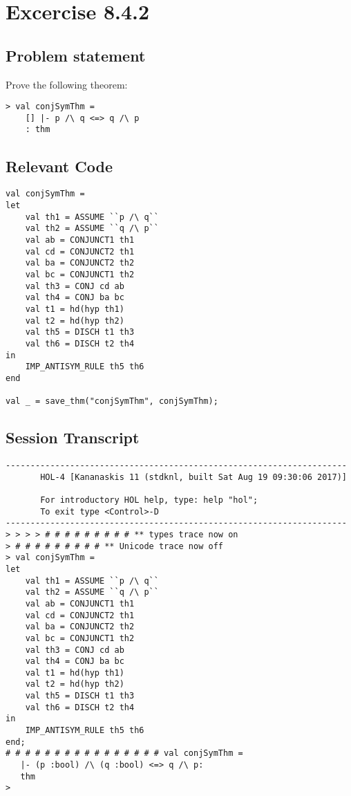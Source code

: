 \documentclass{report}
\begin{document}
\chapter{Excercise 8.4.2}
\label{cha:8.4.2}

\section{Problem statement}
\label{problem-statement-8-4-2}
Prove the following theorem:
\begin{lstlisting}[frame=tblr]
> val conjSymThm =
	[] |- p /\ q <=> q /\ p
	: thm
\end{lstlisting}

\section{Relevant Code}
\label{rel-code-8-4-2}
\begin{lstlisting}[frame=TBlr]
val conjSymThm =
let
	val th1 = ASSUME ``p /\ q``
	val th2 = ASSUME ``q /\ p``
	val ab = CONJUNCT1 th1
	val cd = CONJUNCT2 th1
	val ba = CONJUNCT2 th2
	val bc = CONJUNCT1 th2
	val th3 = CONJ cd ab
	val th4 = CONJ ba bc
	val t1 = hd(hyp th1)
	val t2 = hd(hyp th2)
	val th5 = DISCH t1 th3
	val th6 = DISCH t2 th4
in
	IMP_ANTISYM_RULE th5 th6
end

val _ = save_thm("conjSymThm", conjSymThm);
\end{lstlisting}

\section{Session Transcript}
\label{trans-8-4-2}
\begin{session}
  \begin{scriptsize}
\begin{verbatim}
---------------------------------------------------------------------
       HOL-4 [Kananaskis 11 (stdknl, built Sat Aug 19 09:30:06 2017)]

       For introductory HOL help, type: help "hol";
       To exit type <Control>-D
---------------------------------------------------------------------
> > > > # # # # # # # # # ** types trace now on
> # # # # # # # # # ** Unicode trace now off
> val conjSymThm =
let
	val th1 = ASSUME ``p /\ q``
	val th2 = ASSUME ``q /\ p``
	val ab = CONJUNCT1 th1
	val cd = CONJUNCT2 th1
	val ba = CONJUNCT2 th2
	val bc = CONJUNCT1 th2
	val th3 = CONJ cd ab
	val th4 = CONJ ba bc
	val t1 = hd(hyp th1)
	val t2 = hd(hyp th2)
	val th5 = DISCH t1 th3
	val th6 = DISCH t2 th4
in
	IMP_ANTISYM_RULE th5 th6
end;
# # # # # # # # # # # # # # # # val conjSymThm =
   |- (p :bool) /\ (q :bool) <=> q /\ p:
   thm
> 
\end{verbatim}
  \end{scriptsize}
\end{session}
\end{document}
